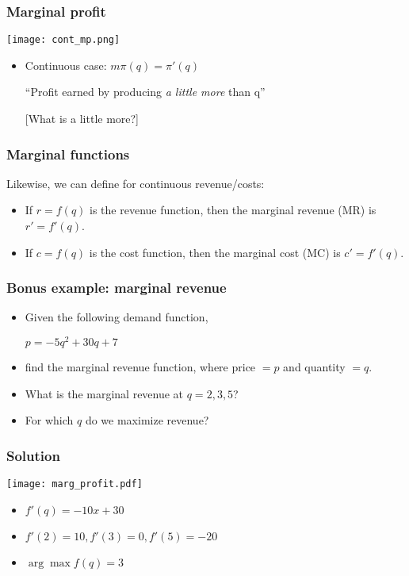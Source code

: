 \documentclass[xcolor=dvipsnames]{beamer} %
\begin{document}
\begin{frame}
\frametitle{Marginal profit}
\begin{scriptsize}
\begin{center}
\texttt{[image: cont\_mp.png]}
\end{center}
\begin{itemize}
     \itemsep\setlength{1em}
\item Continuous case: $m \pi (q) = \pi'(q)$
\item[] ``Profit earned by producing \emph{a little more} than q''
\item[] [What is a little more?]
\end{itemize}
\end{scriptsize}
\end{frame}

\begin{frame}
\frametitle{Marginal functions}
Likewise, we can define for continuous revenue/costs: 
\begin{itemize}
    \itemsep\setlength{1em}
\item If $r = f(q)$ is the revenue function, then the marginal revenue (MR) is $r' = f'(q)$. 
\item If $c = f(q)$ is the cost function, then the marginal cost (MC) is $c' = f'(q)$.  
\end{itemize}
\end{frame}

\begin{frame}
\frametitle{Bonus example: marginal revenue}

\begin{itemize}
    \itemsep\setlength{1em}
\item Given the following demand function,
\item[] $p = -5q^2 + 30q + 7$
\item find the marginal revenue function, where price $=p$ and quantity $=q$.
\item What is the marginal revenue at $q = 2, 3, 5$?
\item For which $q$ do we maximize revenue? 
\end{itemize}

\end{frame}

\begin{frame}
\frametitle{Solution}
\begin{center}
\texttt{[image: marg\_profit.pdf]}
\end{center}
\begin{itemize}
    \item $f'(q) = - 10x + 30$
    \item $f'(2) = 10, f'(3)=0, f'(5) = - 20$
    \item $\arg \max f(q) = 3$
\end{itemize}

\end{frame}
\end{document}
